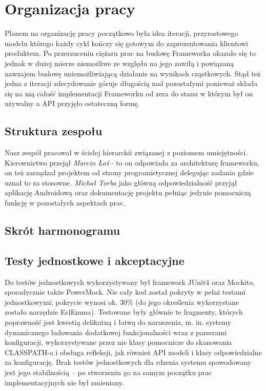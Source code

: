 \chapter{Organizacja pracy}
Planem na organizację pracy początkowo była idea iteracji, przyrostowego modelu którego każdy cykl kończy się gotowym do zaprezentowania klientowi produktem. Po przerzuceniu ciężaru prac na budowę Frameworka okazało się to jednak w dużej mierze niemożliwe ze względu na jego zawiłą i powiązaną nawzajem budowę uniemożliwiającą działanie na wynikach cząstkowych. Stąd też jedna z iteracji zdecydowanie góruje długością nad pozostałymi ponieważ składa się na nią całość implementacji Frameworku od zera do stanu w którym był on używalny a API przyjęło ostateczną formę.

\section{Struktura zespołu}
Nasz zespół pracował w ścisłej hierarchii związanej z poziomem umiejętności. Kierownictwo przejął \emph{Marcin Łoś} - to on odpowiada za architekturę frameworku, on też zarządzał projektem od strony programistycznej delegując zadania gdzie uznał to za stosowne. \emph{Michał Torba} jako główną odpowiedzialność przyjął aplikację Androidową oraz dokumentację projektu pełniąc jedynie pomocniczą funkcję w pozostałych aspektach prac.
\section{Skrót harmonogramu}
\section{Testy jednostkowe i akceptacyjne}

Do testów jednostkowych wykorzystywany był framework JUnit4 oraz Mockito, sporadycznie także
PowerMock. Nie cały kod został pokryty w pełni testami jednostkowymi; pokrycie wynosi ok. 30\% (do
jego określenia wykorzystane zostało narzędzie EclEmma). Testowane były głównie te fragmenty,
których poprawność jest kwestią delikatną i łatwą do naruszenia, m. in. systemy dynamicznego
ładowania dodatkowej funkcjonalności wraz z parserami konfiguracji, wykorzystywane przez nie klasy
pomocnicze do skanowania CLASSPATH-a i obsługa refleksji, jak również API modeli i klasy
odpowiedzialne za konfigurację. Brak testów jednostkowych dla rdzenia systemu spowodowany jest jego
stabilnością -- po stworzeniu go na samym początku prac implementacyjnych nie był zmieniany.


